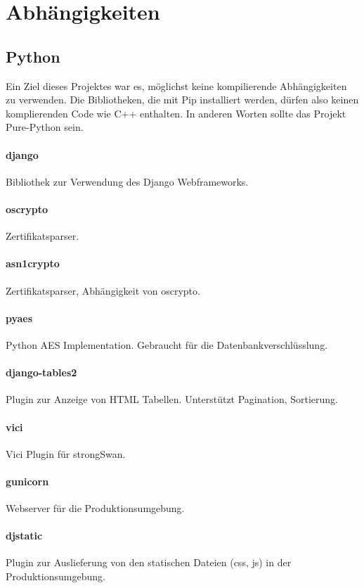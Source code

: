 \section{Abhängigkeiten}

\subsection{Python}
Ein Ziel dieses Projektes war es, möglichst keine kompilierende Abhängigkeiten zu verwenden. Die Bibliotheken, die mit Pip installiert werden, dürfen also keinen komplierenden Code wie C++ enthalten. In anderen Worten sollte das Projekt Pure-Python sein. 

\paragraph{django} \cite{django} Bibliothek zur Verwendung des Django Webframeworks.
\paragraph{oscrypto} \cite{oscrypto} Zertifikatsparser.
\paragraph{asn1crypto} Zertifikatsparser, Abhängigkeit von oscrypto. 
\paragraph{pyaes} \cite{pyaes} Python AES Implementation. Gebraucht für die Datenbankverschlüsslung.
\paragraph{django-tables2} \cite{django-tables} Plugin zur Anzeige von HTML Tabellen. Unterstützt Pagination, Sortierung.
\paragraph{vici} \cite{vici} Vici Plugin für strongSwan.
\paragraph{gunicorn} \cite{gunicorn} Webserver für die Produktionsumgebung.
\paragraph{dj\-static} \cite{dj-static} Plugin zur Auslieferung von den statischen Dateien (css, js) in der Produktionsumgebung.



